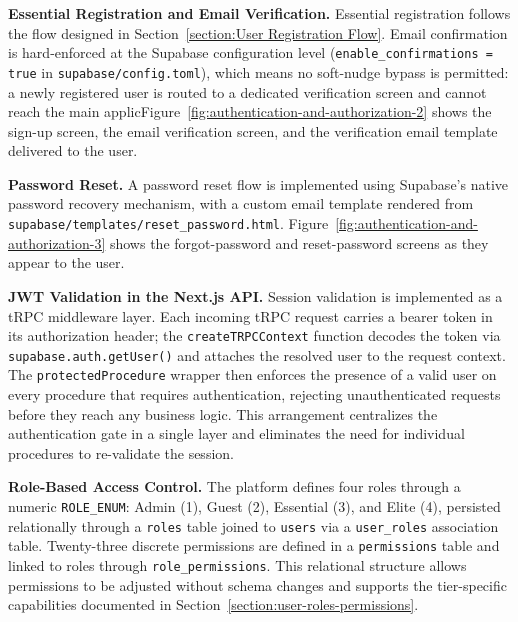 \textbf{Essential Registration and Email Verification.} Essential registration follows the flow designed in Section~\ref{section:User Registration Flow}. Email confirmation is hard-enforced at the Supabase configuration level (\texttt{enable\_confirmations = true} in \texttt{supabase/config.toml}), which means no soft-nudge bypass is permitted: a newly registered user is routed to a dedicated verification screen and cannot reach the main applicFigure~\ref{fig:authentication-and-authorization-2} shows the sign-up screen, the email verification screen, and the verification email template delivered to the user.

\textbf{Password Reset.} A password reset flow is implemented using Supabase's native password recovery mechanism, with a custom email template rendered from \texttt{supabase/templates/reset\_password.html}. Figure~\ref{fig:authentication-and-authorization-3} shows the forgot-password and reset-password screens as they appear to the user.


\textbf{JWT Validation in the Next.js API.} Session validation is implemented as a tRPC middleware layer. Each incoming tRPC request carries a bearer token in its authorization header; the \texttt{createTRPCContext} function decodes the token via \texttt{supabase.auth.getUser()} and attaches the resolved user to the request context. The \texttt{protectedProcedure} wrapper then enforces the presence of a valid user on every procedure that requires authentication, rejecting unauthenticated requests before they reach any business logic. This arrangement centralizes the authentication gate in a single layer and eliminates the need for individual procedures to re-validate the session.

\textbf{Role-Based Access Control.} The platform defines four roles through a numeric \texttt{ROLE\_ENUM}: Admin (1), Guest (2), Essential (3), and Elite (4), persisted relationally through a \texttt{roles} table joined to \texttt{users} via a \texttt{user\_roles} association table. Twenty-three discrete permissions are defined in a \texttt{permissions} table and linked to roles through \texttt{role\_permissions}. This relational structure allows permissions to be adjusted without schema changes and supports the tier-specific capabilities documented in Section~\ref{section:user-roles-permissions}.

